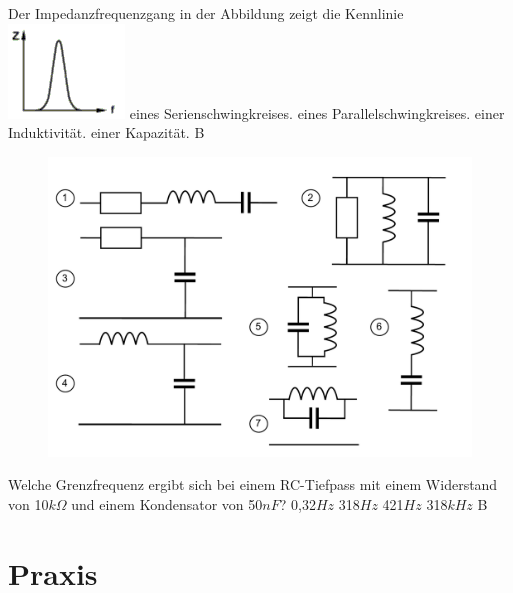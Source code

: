 \vspace*{0.65cm}

{Der Impedanzfrequenzgang in der Abbildung zeigt die Kennlinie\\
\includegraphics[scale=0.5]{Schwingkreis/Bilder/TD202.png}}%
{eines Serienschwingkreises.}%
{eines Parallelschwingkreises.}%
{einer Induktivität.}%
{einer Kapazität.}
{B}%


\begin{figure}[H]
	\centering
	\includegraphics[scale=0.5]{Schwingkreis/Bilder/Filterschaltungen.pdf}
	\end{figure}

{Welche Grenzfrequenz ergibt sich bei einem RC-Tiefpass mit einem Widerstand von 10$k\Omega$ und einem Kondensator von 50$nF$?}%
{0,32$Hz$}%
{318$Hz$}%
{421$Hz$}%
{318$kHz$}%
{B}%

\section*{Praxis}

